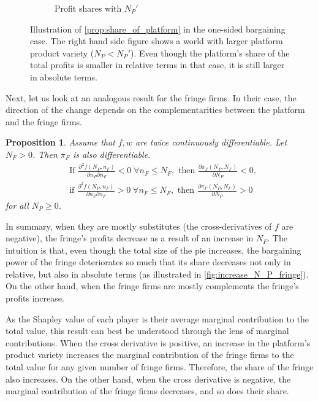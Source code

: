 \documentclass[a4paper]{article}
\newtheorem{proposition}{Proposition}
\begin{document}
\begin{figure}[ht]
\begin{subfigure}[b]{0.45\textwidth}
        \caption{Profit shares with $N_P'$}
    \end{subfigure}
    \caption{Illustration of \cref{prop:share_of_platform} in the one-sided bargaining case. The right hand side figure shows a world with larger platform product variety ($N_P < N_P'$). Even though the platform's share of the total profits is smaller in relative terms in that case, it is still larger in absolute terms.}
    \label{fig:increase_N_P_platform}
\end{figure}

Next, let us look at an analogous result for the fringe firms.
In their case, the direction of the change depends on the complementarities between the platform and the fringe firms.
\begin{proposition}
    \label{prop:share_of_fringe}
    Assume that $f, w$ are twice continuously differentiable.
    Let $N_F > 0$.
    Then $\pi_F$ is also differentiable.
    \begin{align*}
        &\text{If } \frac{\partial^2 f(N_P, n_F)}{\partial n_P \partial n_F} < 0 \;\forall n_F \leq N_F, \text{ then } \frac{\partial \pi_F(N_P, N_F)}{\partial N_P} < 0, \\
        &\text{if } \frac{\partial^2 f(N_P, n_F)}{\partial n_P \partial n_F} > 0 \;\forall n_F \leq N_F, \text{ then } \frac{\partial \pi_F(N_P, N_F)}{\partial N_P} > 0
    \end{align*}
    for all $N_P \geq 0$.
\end{proposition}
In summary, when they are mostly substitutes (the cross-derivatives of $f$ are negative), the fringe's profits decrease as a result of an increase in $N_F$.
The intuition is that, even though the total size of the pie increases, the bargaining power of the fringe deteriorates so much that its share decreases not only in relative, but also in absolute terms (as illustrated in \cref{fig:increase_N_P_fringe}).
On the other hand, when the fringe firms are mostly complements the fringe's profits increase.

As the Shapley value of each player is their average marginal contribution to the total value, this result can best be understood through the lens of marginal contributions.
When the cross derivative is positive, an increase in the platform's product variety increases the marginal contribution of the fringe firms to the total value for any given number of fringe firms.
Therefore, the share of the fringe also increases.
On the other hand, when the cross derivative is negative, the marginal contribution of the fringe firms decreases, and so does their share.
\end{document}
